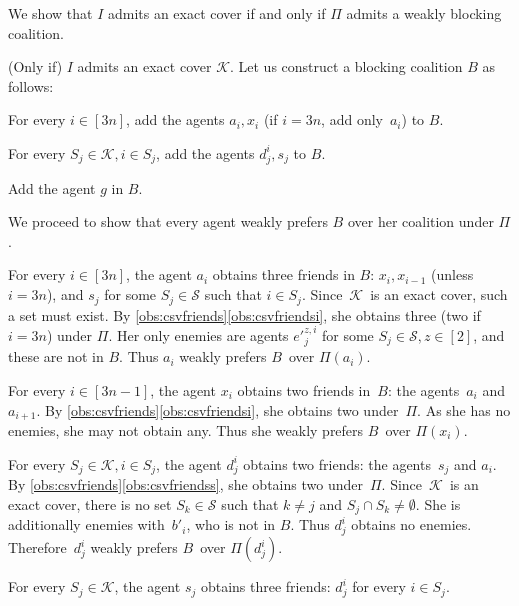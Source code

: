 \documentclass[a4paper,fleqn]{cas-sc}
\newcommand{\partition}{\ensuremath{\Pi}\xspace}
\newcommand{\blockingCoalition}{\ensuremath{B}\xspace}
\newcommand{\sets}{\ensuremath{\mathcal{S}}}
\newcommand{\elements}{\ensuremath{[3n]}}
\newcommand{\sset}[1]{\ensuremath{S_{#1}}}
\newcommand{\ecov}{\ensuremath{\mathcal{K}}}
\begin{document}
{We show that $I$ admits an exact cover if and only if $\partition$ admits a weakly blocking coalition.

(Only if) $I$ admits an exact cover \ecov.
Let us construct a blocking coalition $\blockingCoalition$ as follows:
\begin{compactitem}
\item For every $i \in \elements$, add the agents $a_i, x_i$ (if $i = 3n$, add only~$a_i$) to $\blockingCoalition$.
\item For every $\sset j \in \ecov, i \in \sset j$, add the agents $d^i_j, s_j$ to $\blockingCoalition$.
\item Add the agent $g$ in \blockingCoalition.
\end{compactitem}

We proceed to show that every agent weakly prefers $\blockingCoalition$ over her coalition under \partition.
\begin{compactitem}
\item For every $i \in \elements$, the agent $a_i$ obtains three friends in \blockingCoalition: $x_i, x_{i - 1}$ (unless $i = 3n$), and $s_j$ for some $\sset j \in \sets$ such that $i \in \sset j$. Since~\ecov\ is an exact cover, such a set must exist. By \cref{obs:csvfriends}\eqref{obs:csvfriendsi}, she obtains three (two if $i = 3n$) under \partition. Her only enemies are agents $e'^{z,i}_j$ for some $\sset j \in \sets, z \in [2]$, and these are not in \blockingCoalition.
Thus $a_i$ weakly prefers \blockingCoalition\ over $\partition(a_i)$.
\item For every $i \in [3n - 1]$, the agent $x_i$ obtains two friends in~\blockingCoalition: the agents~$a_i$ and $a_{i + 1}$. 
By \cref{obs:csvfriends}\eqref{obs:csvfriendsi}, she obtains two under~\partition. As she has no enemies, she may not obtain any.
Thus she weakly prefers \blockingCoalition\ over $\partition(x_i)$.
\item For every $\sset j \in \ecov, i \in \sset j$, the agent $d^i_j$ obtains two friends: the agents~$s_j$ and $a_i$. 
By \cref{obs:csvfriends}\eqref{obs:csvfriendss}, she obtains two under~\partition. 
Since~\ecov\ is an exact cover, there is no set $\sset k \in \sets$ such that $k \neq j$ and $\sset j \cap \sset k \neq \emptyset$.
She is additionally enemies with~$b'_i$, who is not in \blockingCoalition.
Thus $d^i_j$ obtains no enemies.
Therefore~$d^i_j$ weakly prefers \blockingCoalition\ over $\partition(d^i_j)$.
\item For every $\sset j \in \ecov$, the agent $s_j$ obtains three friends: $d^i_j$ for every $i \in \sset j$. 

\end{compactitem}}
\end{document}
